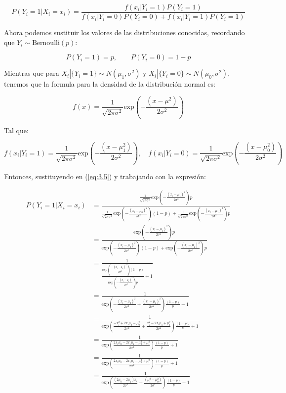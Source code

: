 \begin{equation}
    P(Y_i=1|X_i=x_i)=\frac{f(x_i|Y_i=1)P(Y_i=1)}{f(x_i|Y_i=0)P(Y_i=0)+f(x_i|Y_i=1)P(Y_i=1)}
    \label{eq:3.5}
\end{equation}

Ahora podemos sustituir los valores de las distribuciones conocidas, recordando que $Y_i\sim \text{Bernoulli}(p)$:

\begin{equation*}
    P(Y_i=1)=p,\qquad P(Y_i=0)=1-p
\end{equation*}

Mientras que para $X_i | \{Y_i = 1\} \sim N(\mu_1, \sigma^2)\text{ y }X_i | \{Y_i = 0\} \sim N(\mu_0, \sigma^2),$ tenemos que la formula para la densidad de la distribución normal es:

\begin{equation}
    f(x)=\frac{1}{\sqrt{2\pi\sigma^2}}\text{exp}\left(-\frac{(x-\mu^2)}{2\sigma^2}\right)
    \label{eq:3.6}
\end{equation}

Tal que:

\begin{equation*}
    f(x_i|Y_i=1)=\frac{1}{\sqrt{2\pi\sigma^2}}\text{exp}\left(-\frac{(x-\mu_1^2)}{2\sigma^2}\right), \quad f(x_i|Y_i=0)=\frac{1}{\sqrt{2\pi\sigma^2}}\text{exp}\left(-\frac{(x-\mu_0^2)}{2\sigma^2}\right)
\end{equation*}

Entonces, sustituyendo en (\ref{eq:3.5}) y trabajando con la expresión:

\begin{align*}
    P(Y_i=1|X_i=x_i)&=\frac{\frac{1}{\sqrt{2\pi\sigma^2}}\text{exp}\left(-\frac{(x_i-\mu_1)^2}{2\sigma^2}\right)p}{\frac{1}{\sqrt{2\pi\sigma^2}}\text{exp}\left(-\frac{(x_i-\mu_0)^2}{2\sigma^2}\right)(1-p)+\frac{1}{\sqrt{2\pi\sigma^2}}\text{exp}\left(-\frac{(x_i-\mu_1)^2}{2\sigma^2}\right)p}\\[0.1cm]
    &=\frac{\text{exp}\left(-\frac{(x_i-\mu_1)^2}{2\sigma^2}\right)p}{\text{exp}\left(-\frac{(x_i-\mu_0)^2}{2\sigma^2}\right)(1-p)+\text{exp}\left(-\frac{(x_i-\mu_1)^2}{2\sigma^2}\right)p}\\[0.1cm]
    &=\frac{1}{\frac{\text{exp}\left(-\frac{(x_i-\mu_0)^2}{2\sigma^2}\right)(1-p)}{\text{exp}\left(-\frac{(x_i-\mu_1)^2}{2\sigma^2}\right)p}+1}\\[0.1cm]
    &=\frac{1}{\text{exp}\left(-\frac{(x_i-\mu_0)^2}{2\sigma^2}+\frac{(x_i-\mu_1)^2}{2\sigma^2}\right)\frac{(1-p)}{p}+1}\\[0.1cm]
    &=\frac{1}{\text{exp}\left(\frac{-x_i^2+2x_i\mu_0-\mu_0^2}{2\sigma^2}+\frac{x_i^2-2x_i\mu_1+\mu_1^2}{2\sigma^2}\right)\frac{(1-p)}{p}+1}\\[0.1cm]
    &=\frac{1}{\text{exp}\left(\frac{2x_i\mu_0-2x_i\mu_1-\mu_0^2+\mu_1^2}{2\sigma^2}\right)\frac{(1-p)}{p}+1}\\[0.1cm]
    &=\frac{1}{\text{exp}\left(\frac{2x_i\mu_0-2x_i\mu_1-\mu_0^2+\mu_1^2}{2\sigma^2}\right)\frac{(1-p)}{p}+1}\\[0.1cm]
    &=\frac{1}{\text{exp}\left(\frac{(2\mu_0-2\mu_1)x_i}{2\sigma^2}+\frac{(\mu_1^2-\mu_0^2)}{2\sigma^2}\right)\frac{(1-p)}{p}+1}\\[0.1cm]
\end{align*}

